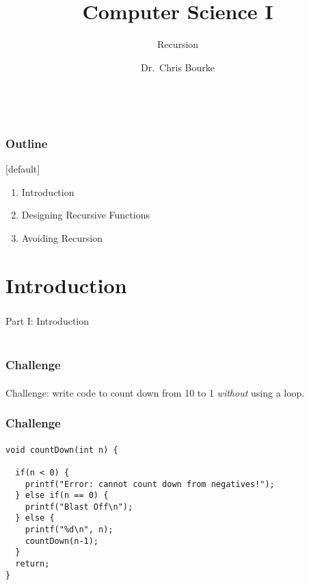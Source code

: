 \documentclass[]{beamer}
\title[~]{Computer Science I}
\subtitle{Recursion}
\author[~]{Dr.\ Chris Bourke\\ \email{cbourke@cse.unl.edu}} %
\date{~}
\begin{document}
\begin{frame}
  \titlepage
\end{frame}


\begin{frame}
  \frametitle{Outline}

[default]
\begin{enumerate}
  \item Introduction
  \item Designing Recursive Functions
  \item Avoiding Recursion
\end{enumerate}

\end{frame}

\section{Introduction}

\begin{frame}
    \frametitle{}
    \framesubtitle{}
    
    \begin{center}
    {\Huge Part I: Introduction}\\
    {\Large ~}
    \end{center}

\end{frame}

\begin{frame}[fragile]
  \frametitle{Challenge}
  \framesubtitle{}

Challenge: write code to count down from 10 to 1 
\emph{without} using a loop.

\end{frame}


\begin{frame}[fragile]
  \frametitle{Challenge}
  \framesubtitle{}

\begin{verbatim}
void countDown(int n) {

  if(n < 0) {
    printf("Error: cannot count down from negatives!");
  } else if(n == 0) {
    printf("Blast Off\n");
  } else {
    printf("%d\n", n);
    countDown(n-1);
  }
  return;
}
\end{verbatim}

\end{frame}
\end{document}
